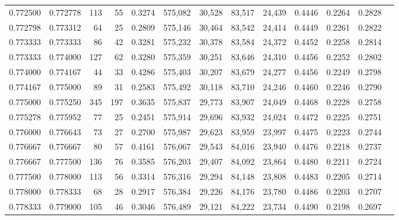 \begin{tabular}{rrrrrrrrrrrrr}
0.772500 & 0.772778 &   113 &  55 &                                     0.3274 & 575,082 &  30,528 &  83,517 &  24,439 & 0.4446 & 0.2264 & 0.2828 \\
0.772798 & 0.773312 &    64 &  25 &                                     0.2809 & 575,146 &  30,464 &  83,542 &  24,414 & 0.4449 & 0.2261 & 0.2822 \\
0.773333 & 0.773333 &    86 &  42 &                                     0.3281 & 575,232 &  30,378 &  83,584 &  24,372 & 0.4452 & 0.2258 & 0.2814 \\
0.773333 & 0.774000 &   127 &  62 &                                     0.3280 & 575,359 &  30,251 &  83,646 &  24,310 & 0.4456 & 0.2252 & 0.2802 \\
0.774000 & 0.774167 &    44 &  33 &                                     0.4286 & 575,403 &  30,207 &  83,679 &  24,277 & 0.4456 & 0.2249 & 0.2798 \\
0.774167 & 0.775000 &    89 &  31 &                                     0.2583 & 575,492 &  30,118 &  83,710 &  24,246 & 0.4460 & 0.2246 & 0.2790 \\
0.775000 & 0.775250 &   345 & 197 &                                     0.3635 & 575,837 &  29,773 &  83,907 &  24,049 & 0.4468 & 0.2228 & 0.2758 \\
0.775278 & 0.775952 &    77 &  25 &                                     0.2451 & 575,914 &  29,696 &  83,932 &  24,024 & 0.4472 & 0.2225 & 0.2751 \\
0.776000 & 0.776643 &    73 &  27 &                                     0.2700 & 575,987 &  29,623 &  83,959 &  23,997 & 0.4475 & 0.2223 & 0.2744 \\
0.776667 & 0.776667 &    80 &  57 &                                     0.4161 & 576,067 &  29,543 &  84,016 &  23,940 & 0.4476 & 0.2218 & 0.2737 \\
0.776667 & 0.777500 &   136 &  76 &                                     0.3585 & 576,203 &  29,407 &  84,092 &  23,864 & 0.4480 & 0.2211 & 0.2724 \\
0.777500 & 0.778000 &   113 &  56 &                                     0.3314 & 576,316 &  29,294 &  84,148 &  23,808 & 0.4483 & 0.2205 & 0.2714 \\
0.778000 & 0.778333 &    68 &  28 &                                     0.2917 & 576,384 &  29,226 &  84,176 &  23,780 & 0.4486 & 0.2203 & 0.2707 \\
0.778333 & 0.779000 &   105 &  46 &                                     0.3046 & 576,489 &  29,121 &  84,222 &  23,734 & 0.4490 & 0.2198 & 0.2697 \\

\end{tabular}
